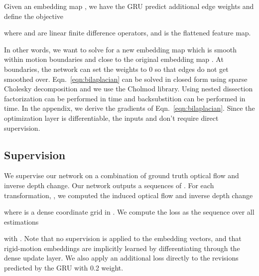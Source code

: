 \documentclass[final]{cvpr}
\begin{document}
Given an embedding map , we have the GRU predict additional edge weights  and define the objective

where  and  are linear finite difference operators, and  is the flattened feature map. 

In other words, we want to solve for a new embedding map  which is smooth within motion boundaries and close to the original embedding map . At boundaries, the network can set the weights to 0 so that edges do not get smoothed over. Eqn.~\ref{eqn:bilaplacian} can be solved in closed form using sparse Cholesky decomposition and we use the Cholmod library\cite{chen2008algorithm}. Using nested dissection\cite{george1973nested} factorization can be performed in  time and backsubstition can be performed in  time. In the appendix, we derive the gradients of Eqn.~\ref{eqn:bilaplacian}. Since the optimization layer is differentiable, the inputs  and  don't require direct supervision.


\subsection{Supervision}
We supervise our network on a combination of ground truth optical flow and inverse depth change. Our network outputs a sequences of . For each transformation, , we computed the induced optical flow and inverse depth change

where  is a dense coordinate grid in . We compute the loss as the sequence over all estimations

with . Note that no supervision is applied to the embedding vectors, and that rigid-motion embeddings are implicitly learned by differentiating through the dense  update layer. We also apply an additional loss directly to the revisions predicted by the GRU with 0.2 weight.



\begin{table*}
\centering
{}
\caption{Results on the FlyingThings3D dataset using the images from the FlowNet3D split. We evaluate on the full images (excluding pixels at infinity and extremely fast moving regions with flow px)}
\label{table:FlyingThingsResults}
\end{table*}
\end{document}
